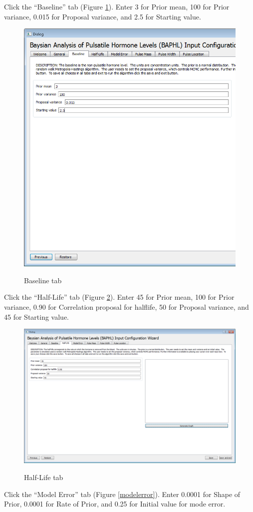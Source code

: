 \documentclass[11pt]{book}
\begin{document}
\newpage
Click the ``Baseline'' tab (Figure \ref{baseline}). Enter 3 for Prior mean, 100 for Prior variance, 0.015 for Proposal variance, and 2.5 for Starting value.\\
\begin{figure}
  \centering
  \includegraphics[width=\textwidth]{baselinetab.PNG}\\
  \caption{Baseline tab}\label{baseline}
\end{figure}
\newpage
Click the ``Half-Life'' tab (Figure \ref{halflife}). Enter 45 for Prior mean, 100 for Prior variance, 0.90 for Correlation proposal for halflife, 50 for Proposal variance, and 45 for Starting value.
\begin{figure}
  \centering
  \includegraphics[width=\textwidth]{halflifetab.PNG}\\
  \caption{Half-Life tab}\label{halflife}
\end{figure}
\newpage
Click the ``Model Error'' tab (Figure \ref{modelerror}). Enter 0.0001 for Shape of Prior, 0.0001 for Rate of Prior, and 0.25 for Initial value for mode error.
\end{document}
